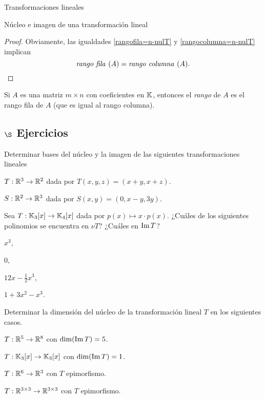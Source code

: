 \begin{chapter}{Transformaciones lineales}
\begin{section}{N\'ucleo e imagen de una transformaci\'on lineal}
\begin{proof}
            Obviamente, las igualdades \eqref{rangofila=n-nulT} y \eqref{rangocolumna=n-nulT} implican 
            $$
        \text{\textit{rango fila }} (A) = \text{\textit{rango  columna }} (A).
        $$
        \end{proof}
    
        \begin{definicion}
                Si $A$ es una matriz $m \times n$ con coeficientes  en $\mathbb K$,  entonces el \textit{rango} de $A$ es el rango fila de $A$ (que es igual al rango columna).
        \end{definicion}
        
        \subsection*{$\S$ Ejercicios}
        \begin{enumex}
            \item Determinar bases del núcleo y la imagen de las siguientes transformaciones lineales
                \begin{enumex}
                    \item $T: \mathbb R^3 \to \mathbb R^2$ dada por $T(x,y,z) = (x+y, x+z)$.
                    \item $S: \mathbb R^2 \to \mathbb R^3$ dada por $S(x,y) = (0,x-y, 3y)$.
                \end{enumex}
            \item Sea $T: \mathbb K_3[x] \to \mathbb K_4[x]$ dada por $p(x) \mapsto x\cdot p(x)$. ¿Cuáles de los siguientes polinomios se encuentra en $\nu T$? ¿Cuáles en  $\operatorname{Im} T$?
            \begin{multicols}{3}
                \begin{enumex}
                    \item $x^3$,
                    \item $0$, 
                    \item $12x-\frac12 x^3$,
                    \item $1 +3x^2 -x^3$.
                \end{enumex}
            \end{multicols}
            \item Determinar la dimensión del núcleo de la transformación lineal $T$ en los siguientes casos. 
                \begin{enumex}
                    \item $T: \mathbb R^5 \to \mathbb R^8$ con $\dim(\operatorname{Im} T) =5$.
                    \item  $T: \mathbb K_3[x]\to \mathbb K_3[x]$ con $\dim(\operatorname{Im} T) =1$.
                    \item  $T: \mathbb R^6 \to \mathbb R^3$ con $T$ epimorfismo.
                    \item $T: \mathbb R^{3 \times 3} \to \mathbb R^{3 \times 3}$ con $T$ epimorfismo.
                \end{enumex}


\end{enumex}
\end{section}
\end{chapter}
